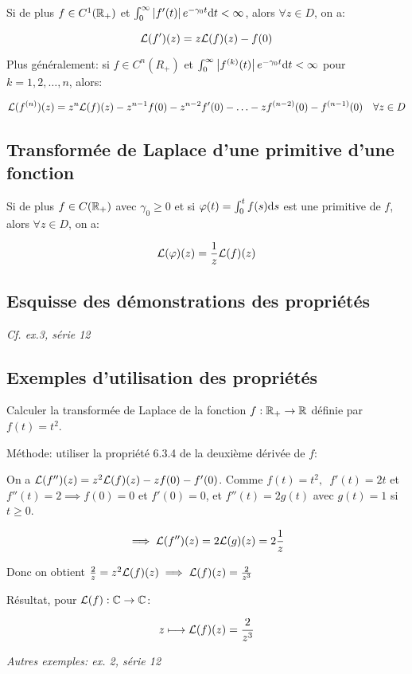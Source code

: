 Si de plus $f \in C^1(\mathbb{R}_+)$ et $\int_0^\infty \left|f'(t)\right| e^{-\gamma_0 t} \mathrm{d}t < \infty$, alors $\forall z \in D$, on a:

\[
    \mathcal{L}(f')(z) = z \mathcal{L}(f)(z) - f(0)
\]

Plus généralement: si $f \in C^n (R_+)$ et $\int_0^\infty \left|f^{(k)}(t)\right| e^{-\gamma_0 t} \mathrm{d}t < \infty$ pour $k = 1, 2, \ldots, n$, alors:

\[
    \mathcal{L}(f^{(n)})(z) = z^n \mathcal{L}(f)(z) - z^{n-1} f(0) - z^{n-2} f'(0)
    - \ldots - z f^{(n-2)}(0) - f^{(n-1)}(0) \quad \forall z \in D
\]

\subsection{Transformée de Laplace d'une primitive d'une fonction}

Si de plus $f \in C(\mathbb{R}_+)$ avec $\gamma_0 \geq 0$ et si $\varphi(t) = \int_0^t f(s) \mathrm{d}s$ est une primitive de $f$, alors $\forall z \in D$, on a:

\[
    \mathcal{L}(\varphi)(z) = \frac{1}{z} \mathcal{L}(f)(z)
\]

\subsection{Esquisse des démonstrations des propriétés}

\textit{Cf. ex.3, série 12}

\subsection{Exemples d'utilisation des propriétés}

\begin{example}
    Calculer la transformée de Laplace de la fonction $f: \mathbb{R}_+ \rightarrow \mathbb{R}$ définie par $f(t) = t^2$.
    
    Méthode: utiliser la propriété 6.3.4 de la deuxième dérivée de $f$:
    
    On a $\mathcal{L}(f'')(z) = z^2 \mathcal{L}(f)(z) - zf(0) - f'(0)$.
    Comme $f(t) = t^2, \enspace f'(t) = 2t$ et $f''(t) = 2 \implies f(0) = 0$ et $f'(0) = 0$, et $f''(t) = 2g(t)$ avec $g(t) = 1$ si $t \geq 0$.
    
    \[ \implies \mathcal{L}(f'')(z) = 2 \mathcal{L}(g)(z) = 2 \frac{1}{z} \]
    
    Donc on obtient $\frac{2}{z} = z^2 \mathcal{L}(f)(z) \implies \mathcal{L}(f)(z) = \frac{2}{z^3}$
    
    Résultat, pour $\mathcal{L}(f): \mathbb{C} \rightarrow \mathbb{C}$:
    
    \[ z \longmapsto \mathcal{L}(f)(z) = \frac{2}{z^3} \]
    
    \textit{Autres exemples: ex. 2, série 12}
\end{example}


